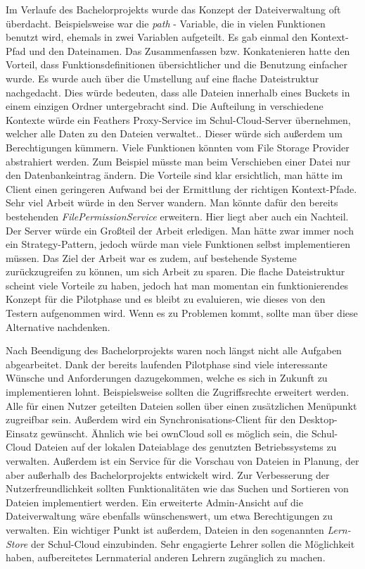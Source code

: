 Im Verlaufe des Bachelorprojekts wurde das Konzept der Dateiverwaltung oft überdacht. Beispielsweise war die \textit{path} - Variable, die in vielen Funktionen benutzt wird, ehemals in zwei Variablen aufgeteilt. Es gab einmal den Kontext-Pfad und den Dateinamen. Das Zusammenfassen bzw. Konkatenieren hatte den Vorteil, dass Funktionsdefinitionen übersichtlicher und die Benutzung einfacher wurde. Es wurde auch über die Umstellung auf eine flache Dateistruktur nachgedacht. Dies würde bedeuten, dass alle Dateien innerhalb eines Buckets in einem einzigen Ordner untergebracht sind. Die Aufteilung in verschiedene Kontexte würde ein Feathers Proxy-Service im Schul-Cloud-Server übernehmen, welcher alle Daten zu den Dateien verwaltet.. Dieser würde sich außerdem um Berechtigungen kümmern. Viele Funktionen könnten vom File Storage Provider abstrahiert werden. Zum Beispiel müsste man beim Verschieben einer Datei nur den Datenbankeintrag ändern. Die Vorteile sind klar ersichtlich, man hätte im Client einen geringeren Aufwand bei der Ermittlung der richtigen Kontext-Pfade. Sehr viel Arbeit würde in den Server wandern. Man könnte dafür den bereits bestehenden \textit{FilePermissionService} erweitern. Hier liegt aber auch ein Nachteil. Der Server würde ein Großteil der Arbeit erledigen. Man hätte zwar immer noch ein Strategy-Pattern, jedoch würde man viele Funktionen selbst implementieren müssen. Das Ziel der Arbeit war es zudem, auf bestehende Systeme zurückzugreifen zu können, um sich Arbeit zu sparen. Die flache Dateistruktur scheint viele Vorteile zu haben, jedoch hat man momentan ein funktionierendes Konzept für die Pilotphase und es bleibt zu evaluieren, wie dieses von den Testern aufgenommen wird. Wenn es zu Problemen kommt, sollte man über diese Alternative nachdenken.

Nach Beendigung des Bachelorprojekts waren noch längst nicht alle Aufgaben abgearbeitet. Dank der bereits laufenden Pilotphase sind viele interessante Wünsche und Anforderungen dazugekommen, welche es sich in Zukunft zu implementieren lohnt. Beispielsweise sollten die Zugriffsrechte erweitert werden. Alle für einen Nutzer geteilten Dateien sollen über einen zusätzlichen Menüpunkt zugreifbar sein. Außerdem wird ein Synchronisations-Client für den Desktop-Einsatz gewünscht. Ähnlich wie bei ownCloud soll es möglich sein, die Schul-Cloud Dateien auf der lokalen Dateiablage des genutzten Betriebssystems zu verwalten. Außerdem ist ein Service für die Vorschau von Dateien in Planung, der aber außerhalb des Bachelorprojekts entwickelt wird. Zur Verbesserung der Nutzerfreundlichkeit sollten Funktionalitäten wie das Suchen und Sortieren von Dateien implementiert werden. Ein erweiterte Admin-Ansicht auf die Dateiverwaltung wäre ebenfalls wünschenswert, um etwa Berechtigungen zu verwalten.  Ein wichtiger Punkt ist außerdem, Dateien in den sogenannten \textit{Lern-Store} \cite{online:zehnforderungen} der Schul-Cloud einzubinden. Sehr engagierte Lehrer sollen die Möglichkeit haben, aufbereitetes Lernmaterial anderen Lehrern zugänglich zu machen. 

\clearpage
